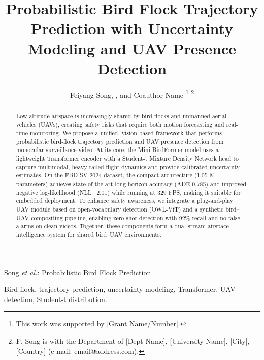 \documentclass[journal]{IEEEtran}
\begin{document}
	
	\title{Probabilistic Bird Flock Trajectory Prediction with Uncertainty Modeling and UAV Presence Detection}
	
	\author{Feiyang Song, , and Coauthor Name
		\thanks{This work was supported by [Grant Name/Number].}
		\thanks{F. Song is with the Department of [Dept Name], [University Name], [City], [Country] (e-mail: email@address.com).}}
	
	{Song \MakeLowercase{\textit{et al.}}: Probabilistic Bird Flock Prediction}
	
	\maketitle
	
	\begin{abstract}
		Low-altitude airspace is increasingly shared by bird flocks and unmanned aerial vehicles (UAVs), creating safety risks that require both motion forecasting and real-time monitoring. We propose a unified, vision-based framework that performs probabilistic bird-flock trajectory prediction and UAV presence detection from monocular surveillance video. At its core, the Mini-BirdFormer model uses a lightweight Transformer encoder with a Student-t Mixture Density Network head to capture multimodal, heavy-tailed flight dynamics and provide calibrated uncertainty estimates. On the FBD-SV-2024 dataset, the compact architecture (1.05 M parameters) achieves state-of-the-art long-horizon accuracy (ADE 0.785) and improved negative log-likelihood (NLL --2.01) while running at 329 FPS, making it suitable for embedded deployment. To enhance safety awareness, we integrate a plug-and-play UAV module based on open-vocabulary detection (OWL-ViT) and a synthetic bird--UAV compositing pipeline, enabling zero-shot detection with 92\% recall and no false alarms on clean videos. Together, these components form a dual-stream airspace intelligence system for shared bird--UAV environments.
	\end{abstract}
	
	
	\begin{IEEEkeywords}
		Bird flock, trajectory prediction, uncertainty modeling, Transformer, UAV detection, Student-t distribution.
	\end{IEEEkeywords}
	
\end{document}
